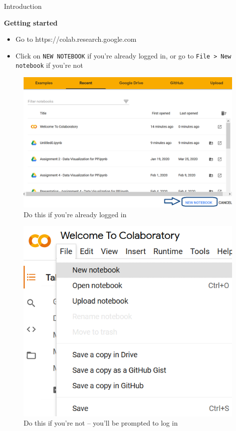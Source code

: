 \documentclass[aspectratio=169]{beamer}
\begin{document}
\begin{frame}{Introduction}

	\textbf{Getting started}

	\begin{itemize}
		\item Go to https://colab.research.google.com
		\item Click on \texttt{NEW NOTEBOOK} if you're already logged in, or go to \texttt{File > New notebook} if you're not
	\end{itemize}

	\begin{multicols}{2}

		\begin{figure}
			\centering
			\includegraphics[width=0.85\linewidth]{img/new_nb_logged_in.png}
			\caption{Do this if you're already logged in}
		\end{figure}
		\begin{figure}
			\centering
			\includegraphics[width=0.55\linewidth]{img/new_nb_not_logged_in.png}
			\caption{Do this if you're not -- you'll be prompted to log in}
		\end{figure}

	\end{multicols}

\end{frame}
\end{document}
